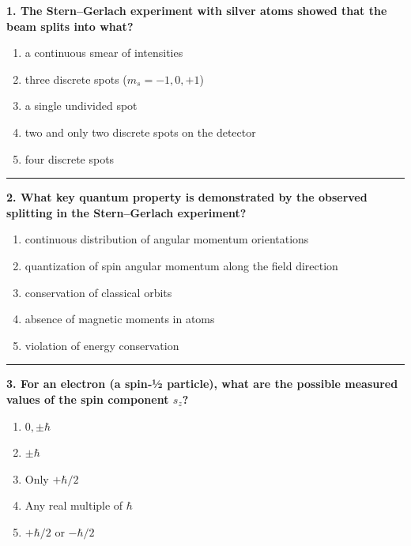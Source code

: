 \documentclass[
  english,
  9pt,
]{extbook}
\providecommand{\tightlist}{%
  \setlength{\itemsep}{0pt}\setlength{\parskip}{0pt}}
\theoremstyle{definition}
\theoremstyle{definition}
\theoremstyle{definition}
\theoremstyle{definition}
\theoremstyle{remark}
\begin{document}
\textbf{1. The Stern--Gerlach experiment with silver atoms showed that the beam splits into what?}

\begin{enumerate}
\def\labelenumi{\alph{enumi}.}
\tightlist
\item
  a continuous smear of intensities\\
\item
  three discrete spots (\(m_s = -1, 0, +1\))\\
\item
  a single undivided spot\\
\item
  two and only two discrete spots on the detector\\
\item
  four discrete spots
\end{enumerate}

\begin{center}\rule{0.5\linewidth}{0.5pt}\end{center}

\textbf{2. What key quantum property is demonstrated by the observed splitting in the Stern--Gerlach experiment?}

\begin{enumerate}
\def\labelenumi{\alph{enumi}.}
\tightlist
\item
  continuous distribution of angular momentum orientations\\
\item
  quantization of spin angular momentum along the field direction\\
\item
  conservation of classical orbits\\
\item
  absence of magnetic moments in atoms\\
\item
  violation of energy conservation
\end{enumerate}

\begin{center}\rule{0.5\linewidth}{0.5pt}\end{center}

\textbf{3. For an electron (a spin‑½ particle), what are the possible measured values of the spin component \(s_z\)?}

\begin{enumerate}
\def\labelenumi{\alph{enumi}.}
\tightlist
\item
  \(0, \pm \hbar\)\\
\item
  \(\pm \hbar\)\\
\item
  Only \(+\hbar/2\)\\
\item
  Any real multiple of \(\hbar\)\\
\item
  \(+\hbar/2\) or \(-\hbar/2\)
\end{enumerate}
\end{document}
